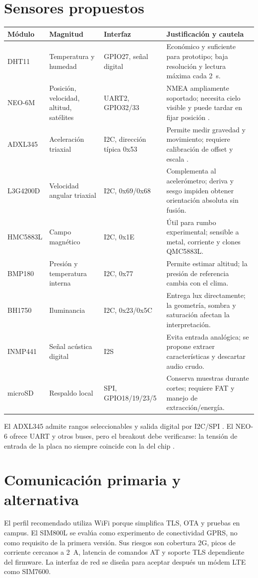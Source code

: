 \documentclass[11pt,a4paper,oneside]{report}
\begin{document}
\section{Sensores propuestos}
\begin{longtable}{p{3.2cm}p{3.3cm}p{3.4cm}p{4.2cm}}
\toprule
\textbf{Módulo} & \textbf{Magnitud} & \textbf{Interfaz} & \textbf{Justificación y cautela}\\
\midrule
\endhead
DHT11 & Temperatura y humedad & GPIO27, señal digital & Económico y suficiente para prototipo; baja resolución y lectura máxima cada 2~s.\\
NEO-6M & Posición, velocidad, altitud, satélites & UART2, GPIO32/33 & NMEA ampliamente soportado; necesita cielo visible y puede tardar en fijar posición \cite{neo6}.\\
ADXL345 & Aceleración triaxial & I2C, dirección típica 0x53 & Permite medir gravedad y movimiento; requiere calibración de offset y escala \cite{adxl}.\\
L3G4200D & Velocidad angular triaxial & I2C, 0x69/0x68 & Complementa al acelerómetro; deriva y sesgo impiden obtener orientación absoluta sin fusión.\\
HMC5883L & Campo magnético & I2C, 0x1E & Útil para rumbo experimental; sensible a metal, corriente y clones QMC5883L.\\
BMP180 & Presión y temperatura interna & I2C, 0x77 & Permite estimar altitud; la presión de referencia cambia con el clima.\\
BH1750 & Iluminancia & I2C, 0x23/0x5C & Entrega lux directamente; la geometría, sombra y saturación afectan la interpretación.\\
INMP441 & Señal acústica digital & I2S & Evita entrada analógica; se propone extraer características y descartar audio crudo.\\
microSD & Respaldo local & SPI, GPIO18/19/23/5 & Conserva muestras durante cortes; requiere FAT y manejo de extracción/energía.\\
\bottomrule
\end{longtable}

El ADXL345 admite rangos seleccionables y salida digital por I2C/SPI
\cite{adxl}. El NEO-6 ofrece UART y otros buses, pero el breakout debe verificarse:
la tensión de entrada de la placa no siempre coincide con la del chip \cite{neo6}.

\section{Comunicación primaria y alternativa}
El perfil recomendado utiliza WiFi porque simplifica TLS, OTA y pruebas en campus.
El SIM800L se evalúa como experimento de conectividad GPRS, no como requisito de la
primera versión. Sus riesgos son cobertura 2G, picos de corriente cercanos a 2~A,
latencia de comandos AT y soporte TLS dependiente del firmware. La interfaz de red se
diseña para aceptar después un módem LTE como SIM7600.
\end{document}
